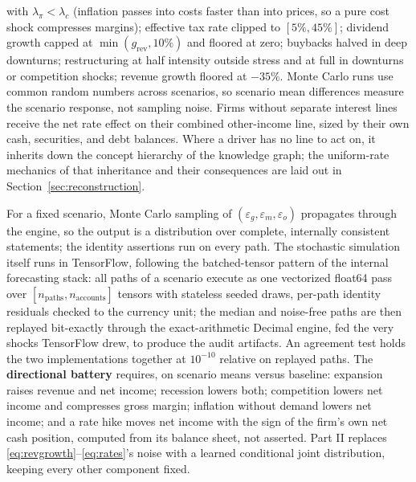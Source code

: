 \documentclass[11pt]{article}
\begin{document}
with $\lambda_\pi < \lambda_c$ (inflation passes into costs faster than into prices, so a pure cost shock compresses margins); effective tax rate clipped to $[5\%, 45\%]$; dividend growth capped at $\min(g_{\text{rev}}, 10\%)$ and floored at zero; buybacks halved in deep downturns; restructuring at half intensity outside stress and at full in downturns or competition shocks; revenue growth floored at $-35\%$. Monte Carlo runs use common random numbers across scenarios, so scenario mean differences measure the scenario response, not sampling noise. Firms without separate interest lines receive the net rate effect on their combined other-income line, sized by their own cash, securities, and debt balances. Where a driver has no line to act on, it inherits down the concept hierarchy of the knowledge graph; the uniform-rate mechanics of that inheritance and their consequences are laid out in Section~\ref{sec:reconstruction}.

For a fixed scenario, Monte Carlo sampling of $(\varepsilon_g, \varepsilon_m, \varepsilon_o)$ propagates through the engine, so the output is a distribution over complete, internally consistent statements; the identity assertions run on every path. The stochastic simulation itself runs in TensorFlow, following the batched-tensor pattern of the internal forecasting stack: all paths of a scenario execute as one vectorized float64 pass over $[n_{\text{paths}}, n_{\text{accounts}}]$ tensors with stateless seeded draws, per-path identity residuals checked to the currency unit; the median and noise-free paths are then replayed bit-exactly through the exact-arithmetic Decimal engine, fed the very shocks TensorFlow drew, to produce the audit artifacts. An agreement test holds the two implementations together at $10^{-10}$ relative on replayed paths. The \textbf{directional battery} requires, on scenario means versus baseline: expansion raises revenue and net income; recession lowers both; competition lowers net income and compresses gross margin; inflation without demand lowers net income; and a rate hike moves net income with the sign of the firm's own net cash position, computed from its balance sheet, not asserted. Part II replaces \eqref{eq:revgrowth}--\eqref{eq:rates}'s noise with a learned conditional joint distribution, keeping every other component fixed.

\end{document}
